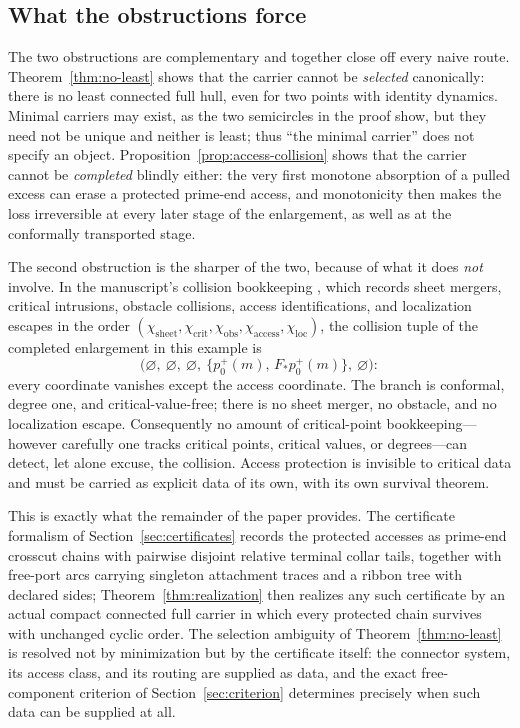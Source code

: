 \subsection{What the obstructions force}\label{subsec:B-moral}

The two obstructions are complementary and together close off every naive
route. Theorem~\ref{thm:no-least} shows that the carrier cannot be
\emph{selected} canonically: there is no least connected full hull, even for
two points with identity dynamics.  Minimal carriers may exist, as the two
semicircles in the proof show, but they need not be unique and neither is
least; thus ``the minimal carrier'' does not specify an object.
Proposition~\ref{prop:access-collision} shows that the carrier cannot be
\emph{completed} blindly either: the very first monotone absorption of a
pulled excess can erase a protected prime-end access, and monotonicity then
makes the loss irreversible at every later stage of the enlargement, as well
as at the conformally transported stage.

The second obstruction is the sharper of the two, because of what it does
\emph{not} involve. In the manuscript's collision bookkeeping \cite{MWman},
which records sheet mergers, critical intrusions, obstacle collisions, access
identifications, and localization escapes in the order
$(\chi_{\mathrm{sheet}},\chi_{\mathrm{crit}},\chi_{\mathrm{obs}},
\chi_{\mathrm{access}},\chi_{\mathrm{loc}})$, the collision tuple of the
completed enlargement in this example is
\[
\bigl(\varnothing,\ \varnothing,\ \varnothing,\
\{p_0^{+}(m),\,F_{*}p_0^{+}(m)\},\ \varnothing\bigr):
\]
every coordinate vanishes except the access coordinate. The
branch is conformal, degree one, and critical-value-free; there is no sheet
merger, no obstacle, and no localization escape. Consequently no amount of
critical-point bookkeeping---however carefully one tracks critical points,
critical values, or degrees---can detect, let alone excuse, the collision.
Access protection is invisible to critical data and must be carried as
explicit data of its own, with its own survival theorem.

This is exactly what the remainder of the paper provides. The certificate
formalism of Section~\ref{sec:certificates} records the protected accesses as
prime-end crosscut chains \cite{Pom92} with pairwise disjoint relative
terminal collar tails, together with free-port arcs carrying singleton attachment traces
and a ribbon tree with declared sides; Theorem~\ref{thm:realization} then
realizes any such certificate by an actual compact connected full carrier in
which every protected chain survives with unchanged cyclic order. The
selection ambiguity of Theorem~\ref{thm:no-least} is resolved not by
minimization but by the certificate itself: the connector system, its access
class, and its routing are supplied as data, and the exact free-component
criterion of Section~\ref{sec:criterion} determines precisely when such data
can be supplied at all.
